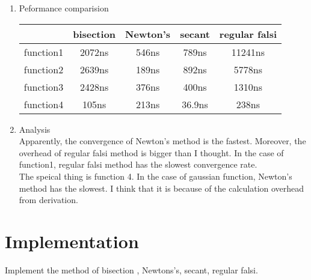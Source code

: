 \documentclass[12pt,letterpaper]{article}
\begin{document}
\begin{enumerate}
\begin{itemize}
\end{itemize}

\item Peformance comparision
\begin{center}
\begin{tabular}{ | c | c | c | c | c |}
    \hline
     &          bisection & Newton's & secant & regular falsi \\
    \hline
    function1 &  2072ns     & 546ns     & 789ns  &  11241ns \\
    function2 &  2639ns     & 189ns     & 892ns  &  5778ns  \\
    function3 &  2428ns     & 376ns     & 400ns  &  1310ns  \\
    function4 &  105ns      & 213ns     & 36.9ns &  238ns   \\
    \hline
\end{tabular}
\end{center}

\item Analysis
\\ Apparently, the convergence of Newton's method is the fastest.
Moreover, the overhead of regular falsi method is bigger than I thought. 
In the case of function1, regular falsi method has the slowest convergence rate.
\\ The speical thing is function 4. In the case of gaussian function, Newton's method has the slowest.
I think that it is because of the calculation overhead from derivation.


\end{enumerate}

\newpage
\section*{Implementation}

Implement the method of bisection , Newtons's, secant, regular falsi.

\end{document}
